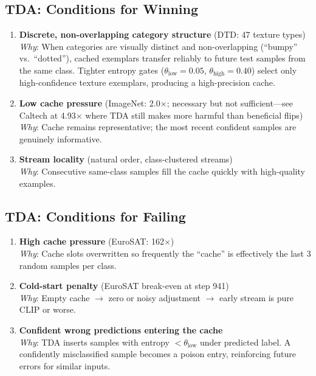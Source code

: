 \documentclass[12pt,a4paper]{article}
\newcommand{\1}{\mathbf{1}}
\begin{document}
\subsection{TDA: Conditions for Winning}

\begin{enumerate}
  \item \textbf{Discrete, non-overlapping category structure} (DTD: 47 texture types)\\
  \textit{Why}: When categories are visually distinct and non-overlapping (``bumpy'' vs.\ ``dotted''), cached exemplars transfer reliably to future test samples from the same class.
  Tighter entropy gates ($\theta_{\text{low}}=0.05$, $\theta_{\text{high}}=0.40$) select only high-confidence texture exemplars, producing a high-precision cache.

  \item \textbf{Low cache pressure} (ImageNet: 2.0$\times$; necessary but not sufficient---see Caltech at 4.93$\times$ where TDA still makes more harmful than beneficial flips)\\
  \textit{Why}: Cache remains representative; the most recent confident samples are genuinely informative.

  \item \textbf{Stream locality} (natural order, class-clustered streams)\\
  \textit{Why}: Consecutive same-class samples fill the cache quickly with high-quality examples.
\end{enumerate}

\subsection{TDA: Conditions for Failing}

\begin{enumerate}
  \item \textbf{High cache pressure} (EuroSAT: 162$\times$)\\
  \textit{Why}: Cache slots overwritten so frequently the ``cache'' is effectively the last 3 random samples per class.

  \item \textbf{Cold-start penalty} (EuroSAT break-even at step 941)\\
  \textit{Why}: Empty cache $\to$ zero or noisy adjustment $\to$ early stream is pure CLIP or worse.

  \item \textbf{Confident wrong predictions entering the cache}\\
  \textit{Why}: TDA inserts samples with entropy $< \theta_{\text{low}}$ under predicted label.
  A confidently misclassified sample becomes a poison entry, reinforcing future errors for similar inputs.
\end{enumerate}
\end{document}
